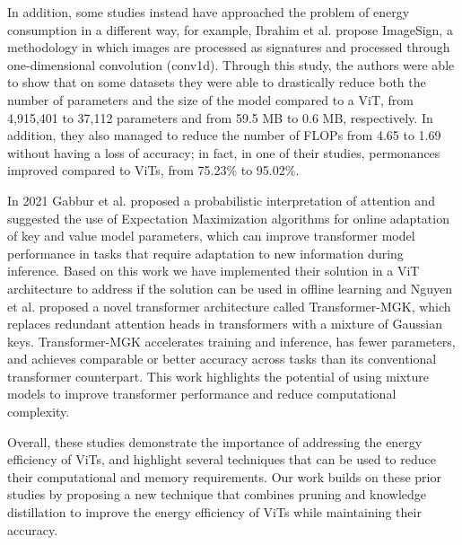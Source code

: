 In addition, some studies instead have approached the problem of energy consumption in a different way, for example, Ibrahim et al. \cite{ibrahim2022imagesig} propose ImageSign, a methodology in which images are processed as signatures and processed through one-dimensional convolution (conv1d). Through this study, the authors were able to show that on some datasets they were able to drastically reduce both the number of parameters and the size of the model compared to a ViT, from 4,915,401 to 37,112 parameters and from 59.5 MB to 0.6 MB, respectively. In addition, they also managed to reduce the number of FLOPs from 4.65 to 1.69 without having a loss of accuracy; in fact, in one of their studies, permonances improved compared to ViTs, from 75.23\% to 95.02\%.

In 2021 Gabbur et al. \cite{DBLP:journals/corr/abs-2010-15583} proposed a probabilistic interpretation of attention and suggested the use of Expectation Maximization algorithms for online adaptation of key and value model parameters, which can improve transformer model performance in tasks that require adaptation to new information during inference. Based on this work we have implemented their solution in a ViT architecture to address if the solution can be used in offline learning and  Nguyen et al. \cite{DBLP:journals/corr/abs-2110-08678,} proposed a novel transformer architecture called Transformer-MGK, which replaces redundant attention heads in transformers with a mixture of Gaussian keys. Transformer-MGK accelerates training and inference, has fewer parameters, and achieves comparable or better accuracy across tasks than its conventional transformer counterpart. This work highlights the potential of using mixture models to improve transformer performance and reduce computational complexity.

Overall, these studies demonstrate the importance of addressing the energy efficiency of ViTs, and highlight several techniques that can be used to reduce their computational and memory requirements. Our work builds on these prior studies by proposing a new technique that combines pruning and knowledge distillation to improve the energy efficiency of ViTs while maintaining their accuracy.